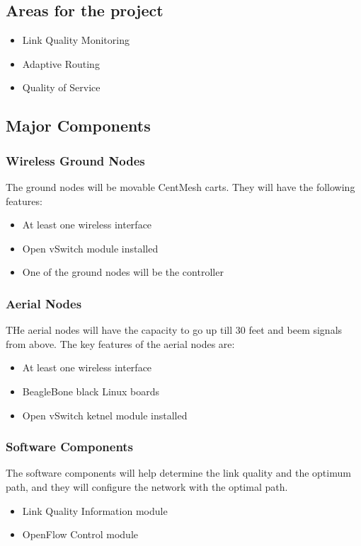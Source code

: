 \documentclass{article}
\begin{document}
\subsection{Areas for the project}
\begin{itemize}
\item Link Quality Monitoring
\item Adaptive Routing
\item Quality of Service
\end{itemize}
\subsection{Major Components}
\subsubsection{Wireless Ground Nodes}
The ground nodes will be movable CentMesh carts. They will have the following features:
\begin{itemize}
\item At least one wireless interface
\item Open vSwitch module installed
\item One of the ground nodes will be the controller
\end{itemize}
\subsubsection{Aerial Nodes}
THe aerial nodes will have the capacity to go up till 30 feet and beem signals from above. The key features of the
aerial nodes are:
\begin{itemize}
\item At least one wireless interface
\item BeagleBone black Linux boards
\item Open vSwitch ketnel module installed
\end{itemize}
\subsubsection{Software Components}
The software components will help determine the link quality and the optimum path, and they will configure the network
with the optimal path.
\begin{itemize}
\item Link Quality Information module
\item OpenFlow Control module
\end{itemize}
\end{document}
